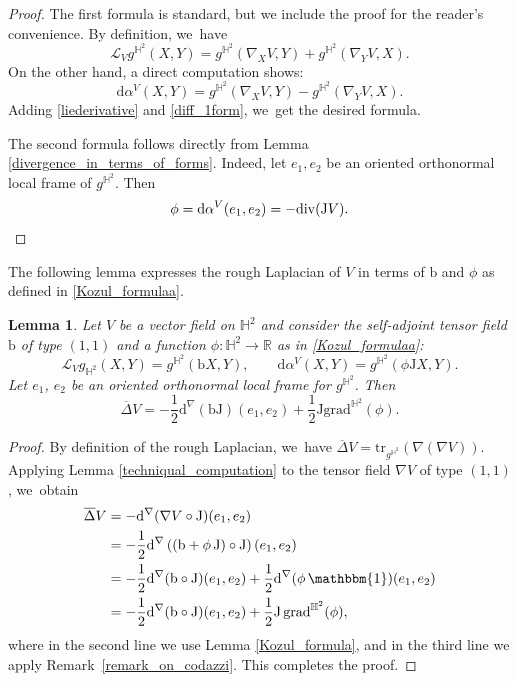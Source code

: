 \documentclass[10pt]{amsart}
\theoremstyle{plain}
\newtheorem{lemma}[cor]{Lemma}
\theoremstyle{definition}
\newcommand{\grad}{\mathrm{grad}^{\mathbb{H}^2}}
\newcommand{\J}{\mathrm{J}}
\begin{document}
\begin{proof}
The first formula is standard, but we include the proof for the reader's convenience. By definition, we~have
\begin{equation}\label{liederivative}
\mathcal{L}_Vg^{\mathbb{H}^2}(X,Y)=g^{\mathbb{H}^2}(\nabla_XV,Y)+g^{\mathbb{H}^2}(\nabla_YV,X).
\end{equation}
On the other hand, a direct computation shows:
\begin{equation}\label{diff_1form}
\mathrm{d}\alpha^V(X,Y)=g^{\mathbb{H}^2}(\nabla_XV,Y)-g^{\mathbb{H}^2}(\nabla_YV,X).
\end{equation}
Adding \eqref{liederivative} and \eqref{diff_1form}, we~get the desired formula.

The second formula follows directly from Lemma \ref{divergence_in_terms_of_forms}. Indeed, let $e_1, e_2$ be an oriented orthonormal local frame of $g^{\mathbb{H}^2}$. Then
\[
\phi=\mathrm{d}\alpha^V(e_1,e_2)=-\mathrm{div}(\mathrm{J} V). \qedhere
\]
\end{proof}
The following lemma expresses the rough Laplacian of \(V \) in terms of \(\mathrm{b} \) and \(\phi \) as defined in \eqref{Kozul_formulaa}.
\begin{lemma}\label{prepa1_CH_HL}
Let $V$ be a vector field on $\mathbb{H}^2$ and consider the self-adjoint tensor field $\mathrm{b}$ of type $(1,1)$ and a function $\phi:\mathbb{H}^2\to \mathbb{R}$ as in \eqref{Kozul_formulaa}:
\[
\mathcal{L}_Vg_{\mathbb{H}^2}(X,Y)=g^{\mathbb{H}^2}(\mathrm{b} X,Y),\qquad \mathrm{d}\alpha^V(X,Y)=g^{\mathbb{H}^2}(\phi \J X,Y).
\]Let $e_1$, $e_2$ be an oriented orthonormal local frame for $g^{\mathbb{H}^2}$. Then
\[
\overline{\Delta}V=-\frac{1}{2}\mathrm{d}^{\nabla}(\mathrm{b}\J)(e_1,e_2)+\frac{1}{2}\J\grad(\phi).
\]
\end{lemma}

\begin{proof}
By definition of the rough Laplacian, we~have \(\overline{\Delta}V = \mathrm{tr}_{g^{\mathbb{H}^2}}(\nabla (\nabla V))\). Applying Lemma \ref{techniqual_computation} to the tensor field \(\nabla V\) of type $(1,1)$, we~obtain
\begin{align*}
\overline{\Delta} V &= -\mathrm{d}^{\nabla}(\nabla V \circ \mathrm{J})(e_1,e_2) \\
&= -\frac{1}{2} \mathrm{d}^{\nabla}\left((\mathrm{b} + \phi\, \mathrm{J}) \circ \mathrm{J}\right) (e_1,e_2)\\
&= -\frac{1}{2} \mathrm{d}^{\nabla}(\mathrm{b} \circ \mathrm{J})(e_1,e_2) + \frac{1}{2} \mathrm{d}^{\nabla}(\phi\, \mathbbm{1})(e_1,e_2) \\
&= -\frac{1}{2} \mathrm{d}^{\nabla}(\mathrm{b} \circ \mathrm{J})(e_1,e_2) + \frac{1}{2} \mathrm{J} \, \mathrm{grad}^{\mathbb{H}^2}(\phi),
\end{align*}
where in the second line we use Lemma \ref{Kozul_formula}, and in the third line we apply Remark~\ref{remark_on_codazzi}. This completes the proof.
\end{proof}
\end{document}
